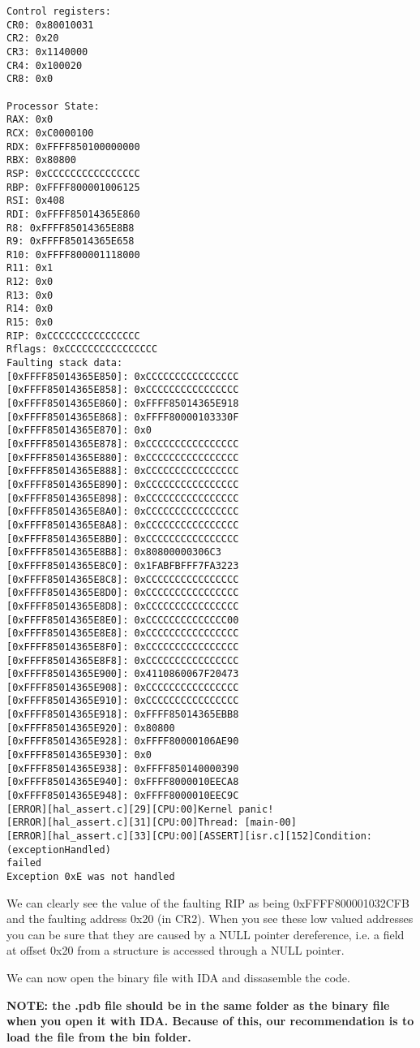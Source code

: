 \begin{appendices}
\begin{verbatim}
Control registers:
CR0: 0x80010031
CR2: 0x20
CR3: 0x1140000
CR4: 0x100020
CR8: 0x0

Processor State:
RAX: 0x0
RCX: 0xC0000100
RDX: 0xFFFF850100000000
RBX: 0x80800
RSP: 0xCCCCCCCCCCCCCCCC
RBP: 0xFFFF800001006125
RSI: 0x408
RDI: 0xFFFF85014365E860
R8: 0xFFFF85014365E8B8
R9: 0xFFFF85014365E658
R10: 0xFFFF800001118000
R11: 0x1
R12: 0x0
R13: 0x0
R14: 0x0
R15: 0x0
RIP: 0xCCCCCCCCCCCCCCCC
Rflags: 0xCCCCCCCCCCCCCCCC
Faulting stack data:
[0xFFFF85014365E850]: 0xCCCCCCCCCCCCCCCC
[0xFFFF85014365E858]: 0xCCCCCCCCCCCCCCCC
[0xFFFF85014365E860]: 0xFFFF85014365E918
[0xFFFF85014365E868]: 0xFFFF80000103330F
[0xFFFF85014365E870]: 0x0
[0xFFFF85014365E878]: 0xCCCCCCCCCCCCCCCC
[0xFFFF85014365E880]: 0xCCCCCCCCCCCCCCCC
[0xFFFF85014365E888]: 0xCCCCCCCCCCCCCCCC
[0xFFFF85014365E890]: 0xCCCCCCCCCCCCCCCC
[0xFFFF85014365E898]: 0xCCCCCCCCCCCCCCCC
[0xFFFF85014365E8A0]: 0xCCCCCCCCCCCCCCCC
[0xFFFF85014365E8A8]: 0xCCCCCCCCCCCCCCCC
[0xFFFF85014365E8B0]: 0xCCCCCCCCCCCCCCCC
[0xFFFF85014365E8B8]: 0x80800000306C3
[0xFFFF85014365E8C0]: 0x1FABFBFFF7FA3223
[0xFFFF85014365E8C8]: 0xCCCCCCCCCCCCCCCC
[0xFFFF85014365E8D0]: 0xCCCCCCCCCCCCCCCC
[0xFFFF85014365E8D8]: 0xCCCCCCCCCCCCCCCC
[0xFFFF85014365E8E0]: 0xCCCCCCCCCCCCCC00
[0xFFFF85014365E8E8]: 0xCCCCCCCCCCCCCCCC
[0xFFFF85014365E8F0]: 0xCCCCCCCCCCCCCCCC
[0xFFFF85014365E8F8]: 0xCCCCCCCCCCCCCCCC
[0xFFFF85014365E900]: 0x4110860067F20473
[0xFFFF85014365E908]: 0xCCCCCCCCCCCCCCCC
[0xFFFF85014365E910]: 0xCCCCCCCCCCCCCCCC
[0xFFFF85014365E918]: 0xFFFF85014365EBB8
[0xFFFF85014365E920]: 0x80800
[0xFFFF85014365E928]: 0xFFFF80000106AE90
[0xFFFF85014365E930]: 0x0
[0xFFFF85014365E938]: 0xFFFF850140000390
[0xFFFF85014365E940]: 0xFFFF8000010EECA8
[0xFFFF85014365E948]: 0xFFFF8000010EEC9C
[ERROR][hal_assert.c][29][CPU:00]Kernel panic!
[ERROR][hal_assert.c][31][CPU:00]Thread: [main-00]
[ERROR][hal_assert.c][33][CPU:00][ASSERT][isr.c][152]Condition: (exceptionHandled)
failed
Exception 0xE was not handled
\end{verbatim}

We can clearly see the value of the faulting RIP as being 0xFFFF800001032CFB and the faulting address
0x20 (in CR2). When you see these low valued addresses you can be sure that they are caused by a
NULL pointer dereference, i.e. a field at offset 0x20 from a structure is accessed through a NULL
pointer.

We can now open the binary file with IDA and dissasemble the code.

\textbf{NOTE: the .pdb file should be in the same folder as the binary file when you open it with
 IDA. Because of this, our recommendation is to load the  file from the bin folder.}


\end{appendices}
